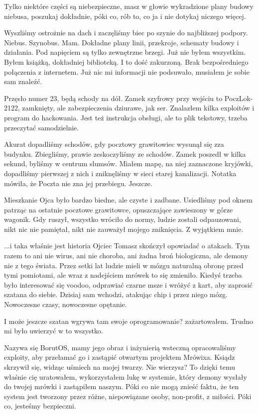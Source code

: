 \ds{} Tylko niektóre części są niebezpieczne, masz w głowie wykradzione plany budowy niebusa, poszukaj dokładnie, póki co, rób to, co ja i nie dotykaj niczego więcej. \de{}

Wyszliśmy ostrożnie na dach i zaczęliśmy biec po szynie do najbliższej podpory.
Niebus. Szynobus. Mam. Dokładne plany linii, przekroje, schematy budowy i działania.
Pod napięciem są tylko zewnętrzne brzegi.
Już nie byłem wszystkim. Byłem książką, dokładniej biblioteką. I to dość zakurzoną.
Brak bezpośredniego połączenia z internetem. Już nic mi informacji nie podsuwało, musiałem je sobie sam znaleźć.

Przęsło numer 23, będą schody na dół. Zamek szyfrowy przy wejściu to PoczLok-2122, zamknięty, ale zabezpieczenia dziurawe, jak ser. 
Znalazłem kilka exploitów i program do hackowania. Jest też instrukcja obsługi, ale to plik tekstowy, trzeba przeczytać samodzielnie.

Akurat dopadliśmy schodów, gdy pocztowy grawitowiec wysunął się zza budynku. 
Zbiegliśmy, prawie zeskoczyliśmy ze schodów. Zamek poszedł w kilka sekund, byliśmy w centrum slumsów.
Miałem mapę, na niej zaznaczone kryjówki, dopadliśmy pierwszej z nich i zniknęliśmy w sieci starej kanalizacji.
Notatka mówiła, że Poczta nie zna jej przebiegu. Jeszcze.

\divider{}
Mieszkanie Ojca było bardzo biedne, ale czyste i zadbane.
Usiedliśmy pod oknem patrząc na ostatnie pocztowe grawitowce, opuszczające zawieszony w górze wagonik.
Gdy ruszył, wszystko wróciło do normy, ludzie zostali odpauzowani, nikt nic nie pamiętał, nikt nie zauważył mojego zniknięcia.
Z wyjątkiem mnie.

\ds{} ...i taka właśnie jest historia \dm{} Ojciec Tomasz skończył opowiadać o atakach. \dm{}
Tym razem to ani nie wirus, ani nie choroba, ani żadna broń biologiczna, ale demony nie z tego świata.
Przez setki lat ludzie mieli w mózgu naturalną obronę przed tymi pomiotami, ale wraz z nadejściem mrówek to się zmieniło.
Kiedyś trzeba było interesować się voodoo, odprawiać czarne msze i wróżyć z kart, aby zaprosić szatana do siebie.
Dzisiaj sam wchodzi, atakując chip i przez niego mózg. Nowoczesne czasy, nowoczesne opętanie.\de{}

\ds{} I może jeszcze szatan wgrywa tam swoje oprogramowanie? \dm{} zażartowałem. Trudno mi było uwierzyć w to wszystko. \de{}

\ds{} Nazywa się BorutOS, mamy jego obraz i inżynierią wsteczną opracowaliśmy exploity, aby przełamać go i zastąpić otwartym projektem Mrówixa. \dm{}
Ksiądz skrzywił się, widząc uśmiech na mojej twarzy. \dm{} Nie wierzysz? To dzięki temu właśnie cię uratowałem, wykorzystałem lukę w systemie, który
demony wysłały do twojej mrówki i zastąpiłem naszym. Póki co nie mogą znieść faktu, że ten system jest tworzony przez różne, niepowiązane osoby, non-profit, z miłości.
Póki co, jesteśmy bezpieczni. \de{}

